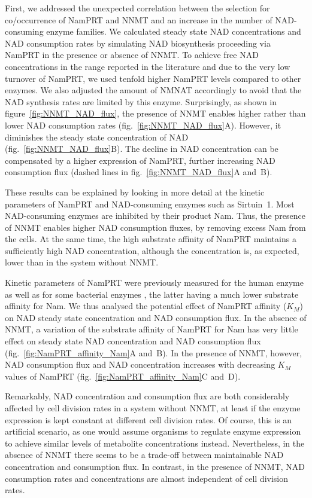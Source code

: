 First, we addressed the unexpected correlation between the selection for co\-/occurrence of NamPRT and NNMT and an increase in the number of NAD-consuming enzyme families. We calculated steady state NAD concentrations and NAD consumption rates by simulating NAD biosynthesis proceeding via NamPRT in the presence or absence of NNMT. To achieve free NAD concentrations in the range reported in the literature and due to the very low turnover of NamPRT, we used tenfold higher NamPRT levels compared to other enzymes. We also adjusted the amount of NMNAT accordingly to avoid that the NAD synthesis rates are limited by this enzyme. Surprisingly, as shown in figure~\ref{fig:NNMT_NAD_flux}, the presence of NNMT enables higher rather than lower NAD consumption rates (fig.~\ref{fig:NNMT_NAD_flux}A). However, it diminishes the steady state concentration of NAD (fig.~\ref{fig:NNMT_NAD_flux}B). The decline in NAD concentration can be compensated by a higher expression of NamPRT, further increasing NAD consumption flux (dashed lines in fig.~\ref{fig:NNMT_NAD_flux}A and~B).

These results can be explained by looking in more detail at the kinetic parameters of NamPRT and NAD-consuming enzymes such as Sirtuin~1. Most NAD-consuming enzymes are inhibited by their product Nam. Thus, the presence of NNMT enables higher NAD consumption fluxes, by removing excess Nam from the cells. At the same time, the high substrate affinity of NamPRT maintains a sufficiently high NAD concentration, although the concentration is, as expected, lower than in the system without NNMT.

Kinetic parameters of NamPRT were previously measured for the human enzyme \citep{Burgos2008} as well as for some bacterial enzymes \citep{Sorci2010}, the latter having a much lower substrate affinity for Nam. We thus analysed the potential effect of NamPRT affinity ($K_{M}$) on NAD steady state concentration and NAD consumption flux. In the absence of NNMT, a variation of the substrate affinity of NamPRT for Nam has very little effect on steady state NAD concentration and NAD consumption flux (fig.~\ref{fig:NamPRT_affinity_Nam}A and~B). In the presence of NNMT, however, NAD consumption flux and NAD concentration increases with decreasing $K_{M}$ values of NamPRT (fig.~\ref{fig:NamPRT_affinity_Nam}C and~D).

Remarkably, NAD concentration and consumption flux are both considerably affected by cell division rates in a system without NNMT, at least if the enzyme expression is kept constant at different cell division rates. Of course, this is an artificial scenario, as one would assume organisms to regulate enzyme expression to achieve similar levels of metabolite concentrations instead. Nevertheless, in the absence of NNMT there seems to be a trade-off between maintainable NAD concentration and consumption flux. In contrast, in the presence of NNMT, NAD consumption rates and concentrations are almost independent of cell division rates.

